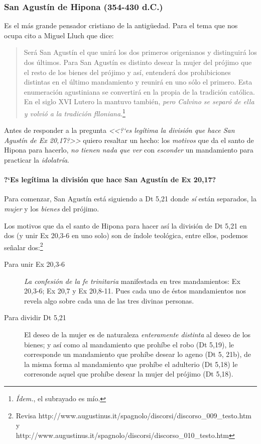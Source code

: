 \documentclass{article}
\begin{document}
\subsubsection{San Agust\'{i}n de Hipona (354-430 d.C.)}

Es el m\'as grande pensador cristiano de la antig\"uedad. Para el tema que nos ocupa cito a Miguel Lluch que dice:

\begin{quote}
Será San Agustín el que unirá los dos primeros origenianos
y distinguirá los dos últimos. Para San Agustín es distinto desear
la mujer del prójimo que el resto de los bienes del prójimo y así, entenderá
dos prohibiciones distintas en el último mandamiento y reunirá en uno
sólo el primero. Esta enumeración agustiniana se convertirá en la propia
de la tradición católica. En el siglo XVI Lutero la mantuvo también, \emph{pero
Calvino se separó de ella y volvió a la tradición flloniana}.\footnote{\emph{\'{I}dem.}, el subrayado es m\'{i}o.}
\end{quote}

\noindent
Antes de responder a la pregunta \emph{<<?`es leg\'{i}tima la divisi\'on que hace San Agust\'{i}n de Ex 20,17?>>} quiero resaltar un hecho: los \emph{motivos} que da el santo de Hipona para hacerlo, \emph{no tienen nada que ver} con \emph{esconder} un mandamiento para practicar la \emph{idolatr\'{i}a}.

\paragraph{?`Es leg\'{i}tima la divisi\'on que hace San Agust\'{i}n de Ex 20,17?}

Para comenzar, San Agust\'{i}n est\'a siguiendo a Dt 5,21 donde \emph{s\'{i}} est\'an separados, la \emph{mujer} y los \emph{bienes} del pr\'ojimo.

Los motivos que da el santo de Hipona para hacer as\'{i} la divisi\'on de Dt 5,21 en dos (y unir Ex 20,3-6 en uno solo) son de \'{i}ndole teol\'ogica, entre ellos, podemos se\~nalar dos:\footnote{Revisa http://www.augustinus.it/spagnolo/discorsi/discorso\_009\_testo.htm y \\ http://www.augustinus.it/spagnolo/discorsi/discorso\_010\_testo.htm}

\begin{description}
\item[Para unir Ex 20,3-6] \emph{La confesi\'on de la fe trinitaria} manifestada en tres mandamientos: Ex 20,3-6; Ex 20,7 y Ex 20,8-11. Pues cada uno de \'estos mandamientos nos revela algo sobre cada una de las tres divinas personas.
\item[Para dividir Dt 5,21] El deseo de la mujer es de naturaleza \emph{enteramente distinta} al deseo de los bienes; y as\'i como al mandamiento que proh\'{i}be el robo (Dt 5,19), le corresponde un mandamiento que proh\'{i}be desear lo ageno (Dt 5, 21b), de la misma forma al mandamiento que proh\'{i}be el adulterio (Dt 5,18) le corresonde aquel que proh\'{i}be desear la mujer del pr\'ojimo (Dt 5,18).
\end{description}
\end{document}
